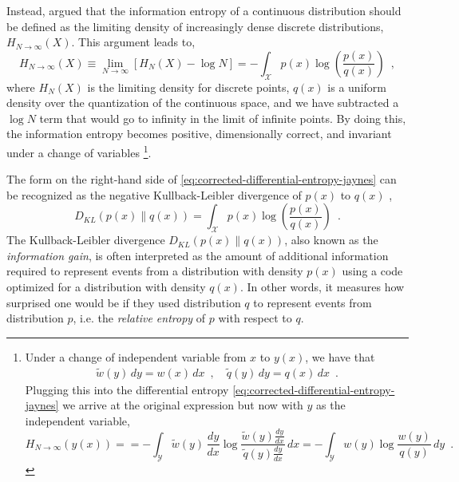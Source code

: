 Instead, \textcite{jaynes_information_1957,jaynes_prior_1968} argued that the information entropy of a continuous distribution should be defined as the limiting density of increasingly dense discrete distributions, $H_{N\rightarrow\infty}(X)$. This argument leads to,
%
\begin{equation} \label{eq:corrected-differential-entropy-jaynes}
    H_{N\rightarrow\infty}(X) \equiv \lim_{N\rightarrow\infty} [H_{N}(X) - \log N] = - \int_\mathcal{X} p(x) \log \left(\frac{p(x)}{q(x)}\right) \enspace ,
\end{equation}
%
where $H_N(X)$ is the limiting density for discrete points, $q(x)$ is a uniform density over the quantization of the continuous space, and we have subtracted a $\log N$ term that would go to infinity in the limit of infinite points.
By doing this, the information entropy becomes positive, dimensionally correct, and invariant under a change of variables%
\footnote{\label{fn:change-of-variables-invariance-of-corrected-differential-entropy}
    Under a change of independent variable from $x$ to $y(x)$, we have that
    \begin{align*}
        \widetilde{w}(y)\,dy = w(x)\,dx \enspace , \quad
        \widetilde{q}(y)\,dy = q(x)\,dx \enspace .
    \end{align*}
    Plugging this into the differential entropy \cref{eq:corrected-differential-entropy-jaynes} we arrive at the original expression but now with $y$ as the independent variable,
    \begin{equation*}
        H_{N\rightarrow\infty}(y(x)) =  = - \int_\mathcal{Y} \widetilde{w}(y)\,\frac{dy}{dx} \log \frac{\widetilde{w}(y)\frac{dy}{dx}}{\widetilde{q}(y)\frac{dy}{dx}} \, dx = - \int_\mathcal{Y} w(y) \log \frac{w(y)}{q(y)} \, dy \enspace .
    \end{equation*}
}.

The form on the right-hand side of \cref{eq:corrected-differential-entropy-jaynes} can be recognized as the negative Kullback-Leibler divergence of $p(x)$ to $q(x)$ \cite{kullback_information_1959},
%
\begin{equation} \label{eq:kullback-leibler-divergence}
    D_{KL}(p(x)\parallel q(x)) = \int_\mathcal{X} p(x) \log \left(\frac{p(x)}{q(x)}\right) \enspace .
\end{equation}
%
The Kullback-Leibler divergence $D_{KL}(p(x)\parallel q(x))$, also known as the \emph{information gain}, is often interpreted as the amount of additional information required to represent events from a distribution with density $p(x)$ using a code optimized for a distribution with density $q(x)$. In other words, it measures how surprised one would be if they used distribution $q$ to represent events from distribution $p$, i.e. the \emph{relative entropy} of $p$ with respect to $q$.

